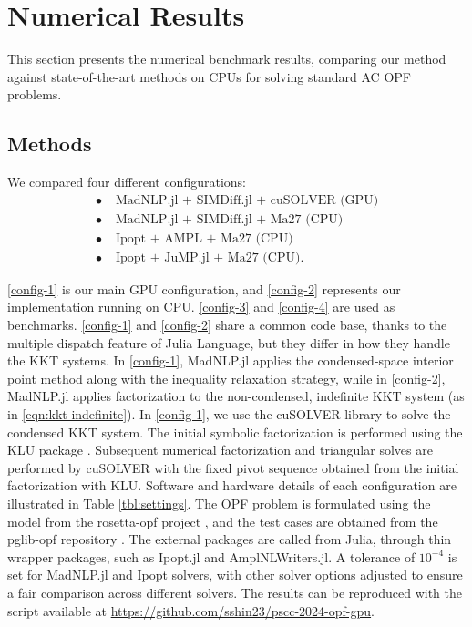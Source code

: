\section{Numerical Results}\label{sec:num}

This section presents the numerical benchmark results, comparing our
method against state-of-the-art methods on CPUs for solving standard
AC OPF problems.

\subsection{Methods}

We compared four different configurations:
\begin{align}
  \label{config-1}\tag{Config 1} \bullet\;&\text{MadNLP.jl + SIMDiff.jl + cuSOLVER (GPU)}\\
  \label{config-2}\tag{Config 2} \bullet\;&\text{MadNLP.jl + SIMDiff.jl + Ma27 (CPU)}\\
  \label{config-3}\tag{Config 3} \bullet\;&\text{Ipopt + AMPL + Ma27 (CPU)}\\
  \label{config-4}\tag{Config 4} \bullet\;&\text{Ipopt + JuMP.jl + Ma27 (CPU)}.
\end{align}

\ref{config-1} is our main GPU configuration, and \ref{config-2}
represents our implementation running on CPU. \ref{config-3} and
\ref{config-4} are used as benchmarks. \ref{config-1} and
\ref{config-2} share a common code base, thanks to the multiple
dispatch feature of Julia Language, but they differ in how they handle
the KKT systems. In \ref{config-1}, MadNLP.jl applies the
condensed-space interior point method along with the inequality
relaxation strategy, while in \ref{config-2}, MadNLP.jl applies
factorization to the non-condensed, indefinite KKT system (as in
\eqref{eqn:kkt-indefinite}). In \ref{config-1}, we use the cuSOLVER
library to solve the condensed KKT system. The initial symbolic
factorization is performed using the KLU package
\cite{davis2004algorithm}. Subsequent numerical factorization and
triangular solves are performed by cuSOLVER with the fixed pivot
sequence obtained from the initial factorization with KLU. Software
and hardware details of each configuration are illustrated in Table
\ref{tbl:settings}. The OPF problem is formulated using
the model from the rosetta-opf project \cite{rosetta-opf}, and the
test cases are obtained from the pglib-opf repository
\cite{babaeinejadsarookolaee2019power}. The external packages are
called from Julia, through thin wrapper packages, such as Ipopt.jl and
AmplNLWriters.jl. A tolerance of $10^{-4}$ is set for MadNLP.jl and
Ipopt solvers, with other solver options adjusted to ensure a fair
comparison across different solvers. The results can be reproduced
with the script available at
\url{https://github.com/sshin23/pscc-2024-opf-gpu}.

